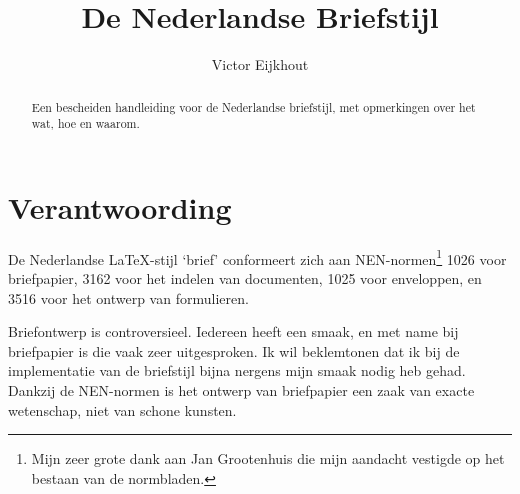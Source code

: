                                                                                 
                                                                
\title{De Nederlandse Briefstijl}                                               
\author{Victor Eijkhout}                                                        
\maketitle                                                                      
                                                                                
\begin{abstract}                                                                
Een bescheiden handleiding voor de Nederlandse briefstijl,                      
met opmerkingen over het wat, hoe en waarom.                                    
\end{abstract}                                                                  
                                                                                
\section{Verantwoording}                                                        
                                                                                
De Nederlandse \LaTeX-stijl `brief' conformeert zich aan                        
NEN-normen\footnote{Mijn zeer grote dank aan Jan Grootenhuis                    
die mijn aandacht vestigde op het bestaan van de normbladen.}                   
1026 voor briefpapier, 3162 voor het indelen van documenten,                    
1025 voor enveloppen, en 3516 voor het ontwerp van formulieren.                 
                                                                                
Briefontwerp is controversieel. Iedereen heeft een smaak, en                    
met name bij briefpapier is die vaak zeer uitgesproken.                         
Ik wil beklemtonen dat ik bij de implementatie van de briefstijl                
bijna nergens mijn smaak nodig heb gehad. Dankzij de NEN-normen                 
is het ontwerp van briefpapier een zaak van exacte wetenschap,                  
niet van schone kunsten.                                                        
                                                                                
